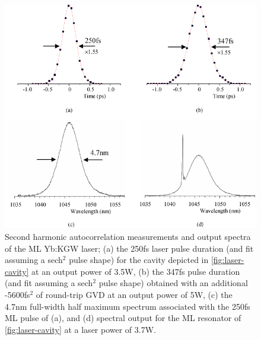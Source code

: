 \begin{figure}
  \centering
  \includegraphics{profile.jpg}
  \caption{
Second harmonic autocorrelation measurements and output spectra of the ML Yb:KGW laser; (a) the 250fs laser pulse duration (and fit assuming a sech$^2$ pulse shape) for the cavity depicted in \protect\ref{fig:laser-cavity}\protect{} at an output power of 3.5W, (b) the 347fs pulse duration (and fit assuming a sech$^2$ pulse shape) obtained with an additional -5600fs$^2$ of round-trip GVD at an output power of 5W, (c) the 4.7nm full-width half maximum spectrum associated with the 250fs ML pulse of (a), and (d) spectral output for the ML resonator of \protect\ref{fig:laser-cavity}\protect{} at a laser power of 3.7W.
  }
  \label{fig:laser-profile}
\end{figure}


